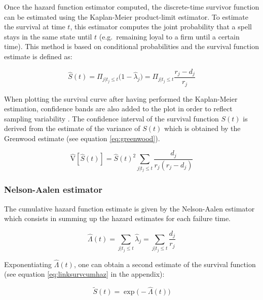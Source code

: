 \documentclass[
]{book}
\begin{document}
Once the hazard function estimator computed, the discrete-time survivor function can be estimated using the Kaplan-Meier product-limit estimator. To estimate the survival at time \(t\), this estimator computes the joint probability that a spell stays in the same state until \(t\) (e.g.~remaining loyal to a firm until a certain time). This method is based on conditional probabilities and the survival function estimate is defined as:

\begin{equation}
  \hat{S}(t) = \Pi_{j|t_j \leq t} \big(1-\hat{\lambda}_j\big) = \Pi_{j|t_j \leq t}\frac{r_j - d_j}{r_j}
  \label{eq:kaplanmeier}
\end{equation}

When plotting the survival curve after having performed the Kaplan-Meier estimation, confidence bands are also added to the plot in order to reflect sampling variability \citep{CAMERON_TRIVEDI}. The confidence interval of the survival function \(S(t)\) is derived from the estimate of the variance of \(S(t)\) which is obtained by the Grenwood estimate (see equation \eqref{eq:greenwood}).

\begin{equation}
  \hat{\mathrm{V}}[\hat{S}(t)] = \hat{S}(t)^2 \sum_{j|t_j \leq t} \frac{d_j}{r_j(r_j-d_j)}
  \label{eq:greenwood}
\end{equation}

\hypertarget{nelson-aalen-estimator}{%
\subsubsection*{Nelson-Aalen estimator}\label{nelson-aalen-estimator}}

The cumulative hazard function estimate is given by the Nelson-Aalen estimator which consists in summing up the hazard estimates for each failure time.

\begin{equation}
  \hat{\Lambda}(t) = \sum_{j | t_j \leq t} \hat{\lambda}_{j} = \sum_{j | t_j \leq t} \frac{d_j}{r_j}
  \label{eq:nelsonaalen}
\end{equation}

Exponentiating \(\hat{\Lambda}(t)\), one can obtain a second estimate of the survival function (see equation \eqref{eq:linksurvcumhaz} in the appendix):

\begin{equation}
    \tilde{S}(t) = \exp \big( -\hat{\Lambda}(t) \big)
    \label{eq:survest}
\end{equation}
\end{document}
